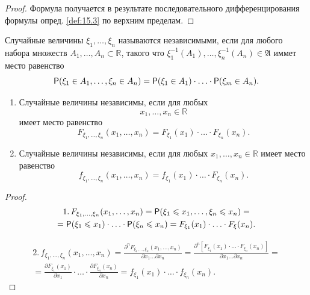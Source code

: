 \begin{proof}
	Формула получается в результате последовательного дифференцирования формулы опред. \ref{def:15.3} по верхним пределам.
\end{proof}

\begin{definition}
	Случайные величины $\xi_1, \dots, \xi_n$ называются независимыми, если для любого набора множеств $A_1,\dots ,A_n \subset \mathbb{R}$, такого что\newline
 	$\xi_1^{-1}(A_1), \dots, \xi_n^{-1}(A_n)\in\mathfrak{A}$ иммет место равенство
 	\begin{equation*}
 		\P(\xi_1\in A_1,\dots,\xi_n\in A_n)=\P(\xi_1 \in A_1)\cdot\ldots\cdot\P(\xi_m\in A_n).
 	\end{equation*}
\end{definition}
 \begin{lemma}
 \begin{enumerate}
 	\item Случайные величины независимы, если для любых $$x_1,\dots, x_n \in \mathbb{R}$$ имеет место равенство
 	\begin{equation*}
 		F_{\xi_1, \dots, \xi_n}(x_1,\dots,x_n)=F_{\xi_1}(x_1)\cdot\ldots\cdot F_{\xi_n}(x_n).
 	\end{equation*}
 	\item Случайные величины независимы, если для любых $x_1,\ldots,x_n\in\mathbb{R}$ имеет место равенство
 	\begin{equation*}
		f_{\xi_1, \dots, \xi_n}(x_1,\dots,x_n)=f_{\xi_1}(x_1)\cdot\ldots\cdot F_{\xi_n}(x_n). 		
 	\end{equation*}
 \end{enumerate}
\end{lemma}

\begin{proof}
	\begin{gather*}
	1. \,F_{\xi_1, \dots, \xi_n}(x_1,\dots,x_n)=\P(\xi_1\leqslant x_1,\ldots,\xi_n
	\leqslant x_n)=\\=
	\P(\xi_1\leqslant x_1)\cdot\ldots\cdot\P(\xi_n\leqslant x_n)=F_{\xi_1}(x_1)\cdot\ldots\cdot F_{\xi}(x_n).
	\end{gather*}	

	
	\begin{gather*}
	2. \,f_{\xi_1,\ldots,\xi_n}(x_1,\ldots,x_n)=
		\frac
		{\partial^nF_{\xi_1, \dots, \xi_n}(x_1,\dots,x_n)}
		{\partial x_1\ldots \partial x_n}=
		\frac
		{\partial^n\left[F_{\xi_1}(x_1)\cdot\ldots\cdot F_{\xi_n}(x_n)\right]}
		{\partial x_1\ldots \partial x_n}=\\=
		\frac{\partial F_{\xi_1}(x_1)}{\partial x_1}\cdot\ldots\cdot
		\frac{\partial F_{\xi_n}(x_n)}{\partial x_n}=f_{\xi_1}(x_1)\cdot\ldots\cdot f_{\xi_n}(x_n).
	\end{gather*}
\end{proof}

